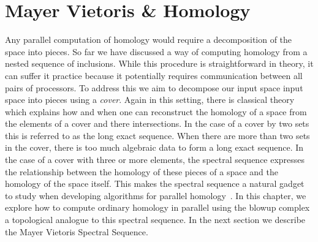 \chapter{Mayer Vietoris \& Homology}
Any parallel computation of homology would require a decomposition of the
space into pieces. So far we have discussed a way of computing homology from a 
nested sequence of inclusions. While this procedure is straightforward in theory, it can suffer it practice
because it potentially requires communication between all pairs of processors. To address this
we aim to decompose our input space input space into pieces using a \emph{cover}. Again in this setting, 
there is classical theory which explains how and when one can reconstruct the homology of a space
from the elements of a cover and there intersections. In the case of a cover by two sets this is referred to as
the \mv long exact sequence. When there are more than two sets in the cover, 
there is too much algebraic data to form a long exact sequence. 
In the case of a cover with three or more elements, the \mv spectral sequence expresses
the relationship between the homology of these pieces of a space and the homology of the space itself.
This makes the \mv spectral sequence a natural gadget to study when developing algorithms for parallel homology~\cite{hatcher}. In this chapter, we explore how to compute ordinary homology in parallel using the \mv blowup complex a topological analogue to this spectral sequence. In the next section we describe the Mayer Vietoris Spectral Sequence.
